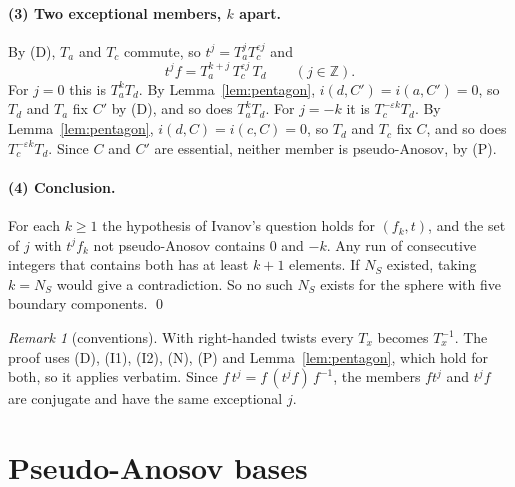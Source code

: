\documentclass[11pt]{article}
\theoremstyle{remark}
\newtheorem{remark}[theorem]{Remark}
\newcommand{\Z}{\mathbb{Z}}
\begin{document}
\paragraph{(3) Two exceptional members, $k$ apart.} By (D), $T_a$ and $T_c$
commute, so $t^j=T_a^jT_c^{\varepsilon j}$ and
\[
t^jf=T_a^{k+j}\,T_c^{\varepsilon j}\,T_d\qquad(j\in\Z).
\]
For $j=0$ this is $T_a^kT_d$. By Lemma~\ref{lem:pentagon},
$i(d,C')=i(a,C')=0$, so $T_d$ and $T_a$ fix $C'$ by (D), and so does
$T_a^kT_d$. For $j=-k$ it is $T_c^{-\varepsilon k}T_d$. By
Lemma~\ref{lem:pentagon}, $i(d,C)=i(c,C)=0$, so $T_d$ and $T_c$ fix $C$,
and so does $T_c^{-\varepsilon k}T_d$. Since $C$ and $C'$ are essential,
neither member is pseudo-Anosov, by (P).

\paragraph{(4) Conclusion.} For each $k\ge1$ the hypothesis of Ivanov's
question holds for $(f_k,t)$, and the set of $j$ with $t^jf_k$ not
pseudo-Anosov contains $0$ and $-k$. Any run of consecutive integers that
contains both has at least $k+1$ elements. If $N_S$ existed, taking
$k=N_S$ would give a contradiction. So no such $N_S$ exists for the sphere
with five boundary components. \qed

\begin{remark}[conventions]\label{rem:conventions}
With right-handed twists every $T_x$ becomes $T_x^{-1}$. The proof uses
(D), (I1), (I2), (N), (P) and Lemma~\ref{lem:pentagon}, which hold for both, so it applies verbatim.
Since $f\,t^j=f\,(t^jf)\,f^{-1}$, the members $ft^j$ and $t^jf$ are
conjugate and have the same exceptional $j$.
\end{remark}

\section{Pseudo-Anosov bases}\label{sec:pa}
\end{document}
